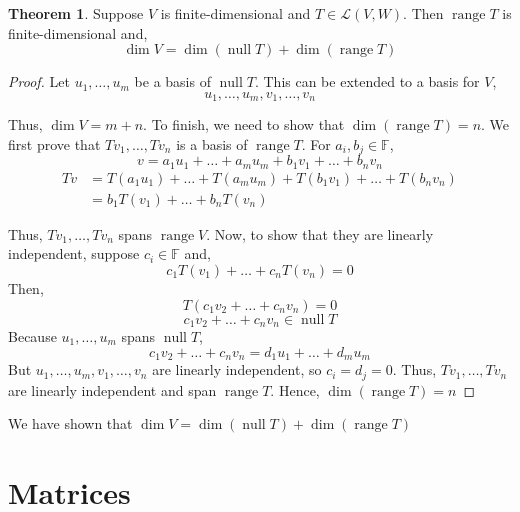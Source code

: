 \documentclass[12pt]{report}
\numberwithin{equation}{section}
\theoremstyle{definition}
\newtheorem{theorem}{Theorem}[section]
\DeclareMathOperator{\nulll}{null}
\DeclareMathOperator{\range}{range}
\begin{document}
\begin{theorem}
	Suppose $ V $ is finite-dimensional and $ T\in\mathcal{L}(V, W) $. Then $ \range T $ is finite-dimensional and,
	\begin{equation}
			\dim V = \dim(\nulll T) + \dim(\range T)
	\end{equation}
	\begin{proof}
		Let $ u_1,\dots,u_m $ be a basis of $ \nulll T $. This can be extended to a basis for $ V $,
		\begin{equation}
				u_1, \dots, u_m, v_1, \dots, v_n
		\end{equation}
	
		Thus, $ \dim V = m+n $. To finish, we need to show that $ \dim(\range T)  = n$. We first prove that $ Tv_1, \dots, Tv_n $ is a basis of $ \range T $. For $ a_i, b_j\in \mathbb{F} $,
		\begin{equation}
				v = a_1u_1 + \dots + a_mu_m  + b_1v_1 + \dots + b_nv_n
		\end{equation}
	\begin{align}
			Tv &= T(a_1u_1) + \dots + T(a_mu_m)  + T(b_1v_1) + \dots + T(b_nv_n) \\
			&= b_1T(v_1) + \dots + b_nT(v_n)
	\end{align}

	Thus, $ Tv_1, \dots, Tv_n $ spans $ \range V $. Now, to show that they are linearly independent, suppose $ c_i\in\mathbb{F} $ and, 
	\begin{equation}
			c_1T(v_1) + \dots + c_nT(v_n) = 0
	\end{equation}
	Then,
	\begin{equation}
			T(c_1v_2 + \dots + c_nv_n) = 0
	\end{equation}
	\begin{equation}
			c_1v_2 + \dots + c_nv_n \in \nulll T
	\end{equation}
	Because $ u_1, \dots, u_m $ spans $ \nulll T $,
	\begin{equation}
			c_1v_2 + \dots + c_nv_n  = d_1u_1 + \dots + d_mu_m
	\end{equation}
	But $ u_1, \dots, u_m, v_1, \dots, v_n $ are linearly independent, so $ c_i = d_j = 0 $. Thus, $ Tv_1, \dots, Tv_n $ are linearly independent and span $ \range T $. Hence, $ \dim(\range T) = n $
	\end{proof}

	We have shown that $\dim V = \dim(\nulll T) + \dim(\range T) $
\end{theorem}

\section{Matrices}







\nocite{*}
	
\appendix
\end{document}
